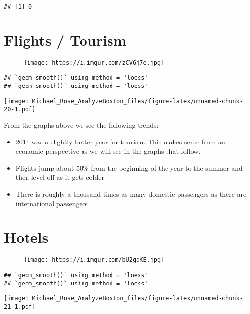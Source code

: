 \documentclass[]{article}
\providecommand{\tightlist}{%
  \setlength{\itemsep}{0pt}\setlength{\parskip}{0pt}}
\begin{document}
\begin{verbatim}
## [1] 0
\end{verbatim}

\newpage

\section{Flights / Tourism}\label{flights-tourism}

\begin{figure}
\centering
\texttt{[image: https://i.imgur.com/zCV6j7e.jpg]}
\caption{}
\end{figure}

\begin{verbatim}
## `geom_smooth()` using method = 'loess'
## `geom_smooth()` using method = 'loess'
\end{verbatim}

\texttt{[image: Michael\_Rose\_AnalyzeBoston\_files/figure-latex/unnamed-chunk-20-1.pdf]}

From the graphs above we see the following trends:

\begin{itemize}
\tightlist
\item
  2014 was a slightly better year for tourism. This makes sense from an
  economic perspective as we will see in the graphs that follow.
\item
  Flights jump about 50\% from the beginning of the year to the summer
  and then level off as it gets colder
\item
  There is roughly a thousand times as many domestic passengers as there
  are international passengers
\end{itemize}

\newpage

\section{Hotels}\label{hotels}

\begin{figure}
\centering
\texttt{[image: https://i.imgur.com/bU2gqKE.jpg]}
\caption{}
\end{figure}

\begin{verbatim}
## `geom_smooth()` using method = 'loess'
## `geom_smooth()` using method = 'loess'
\end{verbatim}

\texttt{[image: Michael\_Rose\_AnalyzeBoston\_files/figure-latex/unnamed-chunk-21-1.pdf]}
\end{document}
